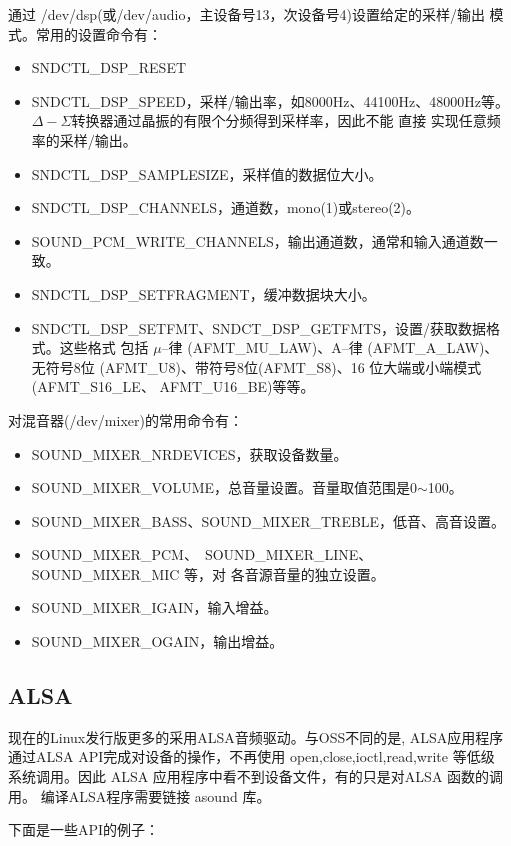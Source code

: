 	通过 /dev/dsp(或/dev/audio，主设备号13，次设备号4)设置给定的采样/输出
模式。常用的设置命令有：
\begin{itemize}
  \item SNDCTL\_DSP\_RESET
  \item SNDCTL\_DSP\_SPEED，采样/输出率，如8000Hz、44100Hz、48000Hz等。
		$\Delta-\Sigma$转换器通过晶振的有限个分频得到采样率，因此不能 直接
        实现任意频率的采样/输出。
  \item SNDCTL\_DSP\_SAMPLESIZE，采样值的数据位大小。
  \item SNDCTL\_DSP\_CHANNELS，通道数，mono(1)或stereo(2)。
  \item SOUND\_PCM\_WRITE\_CHANNELS，输出通道数，通常和输入通道数一致。
  \item SNDCTL\_DSP\_SETFRAGMENT，缓冲数据块大小。
  \item SNDCTL\_DSP\_SETFMT、SNDCT\_DSP\_GETFMTS，设置/获取数据格式。这些格式
		包括 $\mu$--律 (AFMT\_MU\_LAW)、A--律 (AFMT\_A\_LAW)、无符号8位
		(AFMT\_U8)、带符号8位(AFMT\_S8)、16 位大端或小端模式 (AFMT\_S16\_LE、
		AFMT\_U16\_BE)等等。
\end{itemize}

	对混音器(/dev/mixer)的常用命令有：
\begin{itemize}
  \item SOUND\_MIXER\_NRDEVICES，获取设备数量。
  \item SOUND\_MIXER\_VOLUME，总音量设置。音量取值范围是0$\sim$100。
  \item SOUND\_MIXER\_BASS、SOUND\_MIXER\_TREBLE，低音、高音设置。
  \item SOUND\_MIXER\_PCM、~SOUND\_MIXER\_LINE、SOUND\_MIXER\_MIC 等，对
		各音源音量的独立设置。 
  \item SOUND\_MIXER\_IGAIN，输入增益。
  \item SOUND\_MIXER\_OGAIN，输出增益。
\end{itemize}

\subsection{ALSA}
现在的Linux发行版更多的采用ALSA音频驱动。与OSS不同的是, ALSA应用程序
通过ALSA API完成对设备的操作，不再使用 open,close,ioctl,read,write 等低级
系统调用。因此 ALSA 应用程序中看不到设备文件，有的只是对ALSA 函数的调用。
编译ALSA程序需要链接 asound 库。

下面是一些API的例子：

